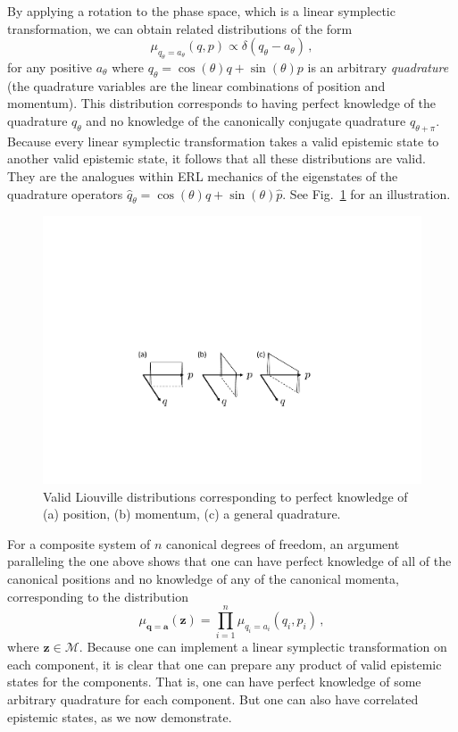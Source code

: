\documentclass[pra,superscriptaddress,nofootinbib,12pt]{revtex4-2}
\begin{document}
By applying a rotation to the phase space, which is a linear symplectic transformation, we can obtain related distributions of the form
\begin{equation}
  \mu_{q_\theta = a_\theta}(q,p) \propto \delta(q_\theta - a_\theta) \,,
\end{equation}
for any positive $a_{\theta}$ where $q_{\theta} = \cos(\theta)q +\sin(\theta)p$ is an arbitrary \emph{quadrature} (the quadrature variables are the linear combinations of position and momentum). This distribution corresponds to having perfect knowledge of the quadrature $q_{\theta}$ and no knowledge of the canonically conjugate quadrature $q_{\theta+\pi}$.  Because every linear symplectic transformation takes a valid epistemic state to another valid epistemic state, it follows that all these distributions are valid.  They are the analogues within ERL mechanics of the eigenstates of the quadrature operators $\hat{q}_{\theta} = \cos(\theta)\hat{q} +\sin(\theta)\hat{p}$.  See Fig.~\ref{fig:Quadratures} for an illustration.

\begin{figure}
\begin{center}
\includegraphics[width=1\hsize]{Quadratures}
\caption{Valid Liouville distributions corresponding to perfect knowledge of (a) position, (b) momentum, (c) a general quadrature.}\label{fig:Quadratures}
\end{center}
\end{figure}


For a composite system of $n$ canonical degrees of freedom, an argument paralleling the one above shows that one can have perfect knowledge of all of the canonical positions and no knowledge of any of the canonical momenta, corresponding to the distribution
\begin{equation}
  \mu_{\mathbf{q}=\mathbf{a}}(\mathbf{z}) = \prod_{i=1}^n \mu_{q_i=a_i}(q_i,p_i)\,,
\end{equation}
where $\mathbf{z} \in \mathcal{M}$.  Because one can implement a linear symplectic transformation on each component, it is clear that one can prepare any product of valid epistemic states for the components. That is, one can have perfect knowledge of some arbitrary quadrature for each component. But one can also have correlated epistemic states, as we now demonstrate.
\end{document}
